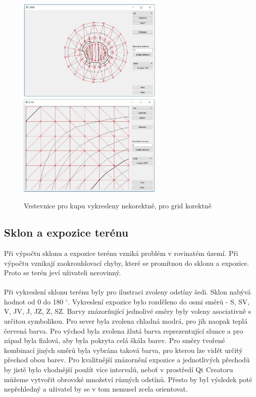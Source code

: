 \documentclass[a4paper, 12pt]{article}
\begin{document}
\begin{figure}[h!]
\centering
\includegraphics[width=7cm]{pictures/hill_bad.jpg}
\includegraphics[width=7cm]{pictures/grid_ok.jpg}
\caption{Vrstevnice pro kupu vykresleny nekorektně, pro grid korektně}
\end{figure}

\subsection{Sklon a expozice terénu}
Při výpočtu sklonu a expozice terénu vzniká problém v rovinatém území. Při výpočtu vznikají zaokrouhlovací chyby, které se promítnou do sklonu a expozice. Proto se terén jeví uživateli nerovinný.\\
\\
Při vykreslení sklonu terénu byly pro ilustraci zvoleny odstíny šedi. Sklon nabývá hodnot od 0 do 180 $^\circ$. Vykreslení expozice bylo rozděleno do osmi směrů - S, SV, V, JV, J, JZ, Z, SZ. Barvy znázorňující jednolivé směry byly voleny asociativně s určitou symbolikou. Pro sever byla zvolena chladná modrá, pro jih naopak teplá červená barva. Pro východ byla zvolena žlutá barva reprezentující slunce a pro západ byla fialová, aby byla pokryta celá škála barev. Pro směry tvořené kombinací jiných směrů byla vybrána taková barva, pro kterou lze vidět určitý přechod obou barev. Pro kvalitnější znázornění expozice a jednotlivých přechodů by jistě bylo vhodnější použít více intervalů, neboť v prostředí Qt Creatoru můžeme vytvořit obrovské množství různých odstínů. Přesto by byl výsledek poté nepřehledný a uživatel by se v tom nemusel zcela orientovat. \\
\end{document}
